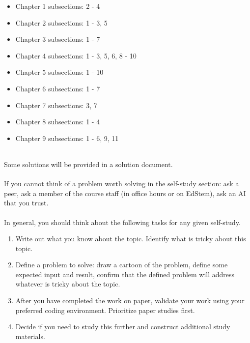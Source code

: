 \documentclass[addpoints,12pt]{exam}
\newcommand{\Soln}[1]{{\color{red}{SOLUTION: #1}}}%
\begin{document}
\begin{itemize}
    \item Chapter 1 subsections: 2 - 4
    \item Chapter 2 subsections: 1 - 3, 5
    \item Chapter 3 subsections: 1 - 7
    \item Chapter 4 subsections: 1 - 3, 5, 6, 8 - 10
    \item Chapter 5 subsections: 1 - 10
    \item Chapter 6 subsections: 1 - 7
    \item Chapter 7 subsections: 3, 7
    \item Chapter 8 subsections: 1 - 4
    \item Chapter 9 subsections: 1 - 6, 9, 11
\end{itemize}    
\\
Some solutions will be provided in a solution document.
\\
\\
If you cannot think of a problem worth solving in the self-study section: ask a peer, ask a member of the course staff (in office hours or on EdStem), ask an AI that you trust. 
\\
\\
In general, you should think about the following tasks for any given self-study.
\begin{enumerate}
    \item Write out what you know about the topic. Identify what is tricky about this topic.
    \item Define a problem to solve: draw a cartoon of the problem, define some expected input and result, confirm that the defined problem will address whatever is tricky about the topic.
    \item After you have completed the work on paper, validate your work using your preferred coding environment. Prioritize paper studies first.
    \item Decide if you need to study this further and construct additional study materials.
\end{enumerate}
\newpage
\end{document}
